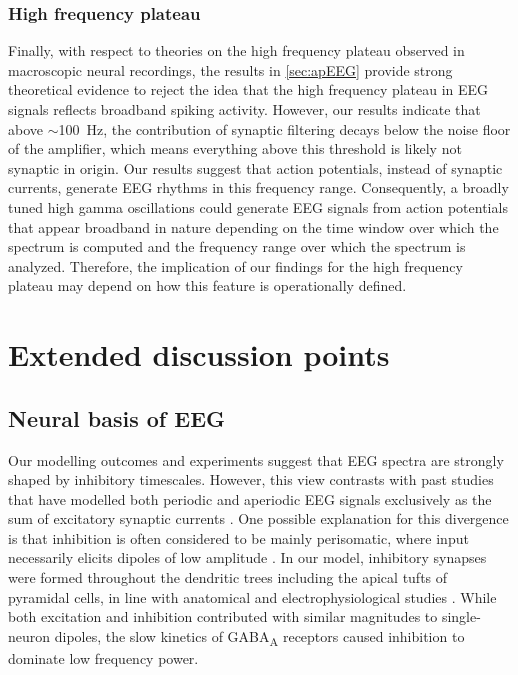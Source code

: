 \subsubsection{High frequency plateau}
Finally, with respect to theories on the high frequency plateau observed in macroscopic neural recordings, the results in \autoref{sec:apEEG} provide strong theoretical evidence to reject the idea that the high frequency plateau in EEG signals reflects broadband spiking activity. However, our results indicate that above $\sim$\qty{100}{\hertz}, the contribution of synaptic filtering decays below the noise floor of the amplifier, which means everything above this threshold is likely not synaptic in origin. Our results suggest that action potentials, instead of synaptic currents, generate EEG rhythms in this frequency range. Consequently, a broadly tuned high gamma oscillations could generate EEG signals from action potentials that appear broadband in nature depending on the time window over which the spectrum is computed and the frequency range over which the spectrum is analyzed. Therefore, the implication of our findings for the high frequency plateau may depend on how this feature is operationally defined.

\section{Extended discussion points}

\subsection{Neural basis of EEG}
Our modelling outcomes and experiments suggest that EEG spectra are strongly shaped by inhibitory timescales. However, this view contrasts with past studies that have modelled both periodic and aperiodic EEG signals exclusively as the sum of excitatory synaptic currents \cite{Miller2007,Jensen2005,McCarthy2008,Ching2010}. One possible explanation for this divergence is that inhibition is often considered to be mainly perisomatic, where input necessarily elicits dipoles of low amplitude \cite{Nunez2006,Næss2021,Ahlfors2015}. In our model, inhibitory synapses were formed throughout the dendritic trees including the apical tufts of pyramidal cells, in line with anatomical and electrophysiological studies \cite{Palmer2012, Karimi2020, Iacaruso2017}. While both excitation and inhibition contributed with similar magnitudes to single-neuron dipoles, the slow kinetics of GABA\textsubscript{A} receptors caused inhibition to dominate low frequency power. 

